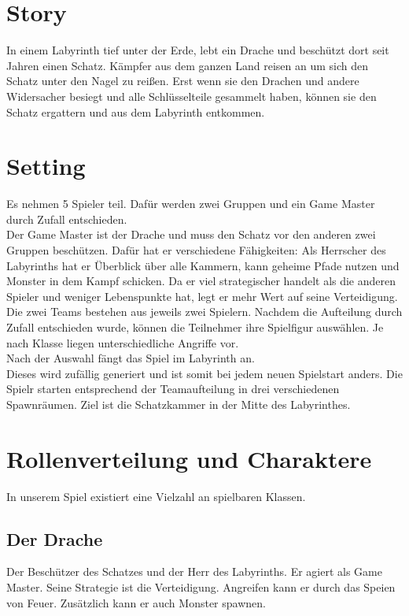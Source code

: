 \documentclass[10pt,a4paper,notitlepage]{scrreprt}
\begin{document}
		\section{Story}
		In einem Labyrinth tief unter der Erde, lebt ein Drache und beschützt dort seit Jahren einen Schatz. Kämpfer aus dem ganzen Land reisen an um sich den Schatz unter den Nagel zu reißen. Erst wenn sie den Drachen und andere Widersacher besiegt und alle Schlüsselteile gesammelt haben, können sie den Schatz ergattern und aus dem Labyrinth entkommen.\\
		
		\section{Setting}
		Es nehmen 5 Spieler teil. Dafür werden zwei Gruppen und ein Game Master durch Zufall entschieden.\\
		Der Game Master ist der Drache und muss den Schatz vor den anderen zwei Gruppen beschützen. Dafür hat er verschiedene Fähigkeiten: Als Herrscher des Labyrinths hat er Überblick über alle Kammern, kann geheime Pfade nutzen und Monster in dem Kampf schicken. Da er viel strategischer handelt als die anderen Spieler und weniger Lebenspunkte hat, legt er mehr Wert auf seine Verteidigung.\\
		Die zwei Teams bestehen aus jeweils zwei Spielern. Nachdem die Aufteilung durch Zufall entschieden wurde, können die Teilnehmer ihre Spielfigur auswählen. Je nach Klasse liegen unterschiedliche Angriffe vor.\\
		Nach der Auswahl fängt das Spiel im Labyrinth an. \\
		Dieses wird zufällig generiert und ist somit bei jedem neuen Spielstart anders. Die Spielr starten entsprechend der Teamaufteilung in drei verschiedenen Spawnräumen. Ziel ist die Schatzkammer in der Mitte des Labyrinthes.\\
		
		\section{Rollenverteilung und Charaktere}
		In unserem Spiel existiert eine Vielzahl an spielbaren Klassen.\\

			\subsection{Der Drache} 
			Der Beschützer des Schatzes und der Herr des Labyrinths. Er agiert als Game Master. Seine Strategie ist die Verteidigung. Angreifen kann er durch das Speien von Feuer. Zusätzlich kann er auch Monster spawnen.\\
			
\end{document}
